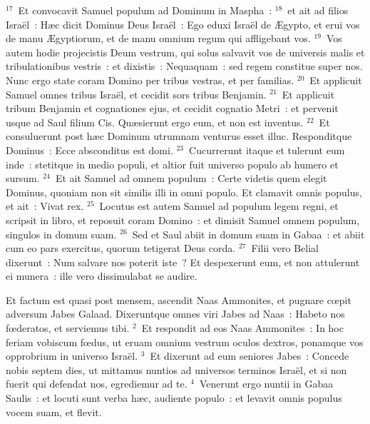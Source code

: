 ${}^{17}$~Et convocavit Samuel populum ad Dominum in Maspha~:
${}^{18}$~et ait ad filios Isra\"el~: H\ae c dicit Dominus Deus Isra\"el~: Ego eduxi Isra\"el de \AE gypto, et erui vos de manu \AE gyptiorum, et de manu omnium regum qui affligebant vos.
${}^{19}$~Vos autem hodie projecistis Deum vestrum, qui solus salvavit vos de universis malis et tribulationibus vestris~: et dixistis~: Nequaquam~: sed regem constitue super nos. Nunc ergo state coram Domino per tribus vestras, et per familias.
${}^{20}$~Et applicuit Samuel omnes tribus Isra\"el, et cecidit sors tribus Benjamin.
${}^{21}$~Et applicuit tribum Benjamin et cognationes ejus, et cecidit cognatio Metri~: et pervenit usque ad Saul filium Cis. Qu\ae sierunt ergo eum, et non est inventus.
${}^{22}$~Et consuluerunt post h\ae c Dominum utrumnam venturus esset illuc. Responditque Dominus~: Ecce absconditus est domi.
${}^{23}$~Cucurrerunt itaque et tulerunt eum inde~: stetitque in medio populi, et altior fuit universo populo ab humero et sursum.
${}^{24}$~Et ait Samuel ad omnem populum~: Certe videtis quem elegit Dominus, quoniam non sit similis illi in omni populo. Et clamavit omnis populus, et ait~: Vivat rex.
${}^{25}$~Locutus est autem Samuel ad populum legem regni, et scripsit in libro, et reposuit coram Domino~: et dimisit Samuel omnem populum, singulos in domum suam.
${}^{26}$~Sed et Saul abiit in domum suam in Gabaa~: et abiit cum eo pars exercitus, quorum tetigerat Deus corda.
${}^{27}$~Filii vero Belial dixerunt~: Num salvare nos poterit iste~? Et despexerunt eum, et non attulerunt ei munera~: ille vero dissimulabat se audire.

\lettrine[lines=10,image=true,loversize=0.05,lraise=-0.03]{E}{}t factum est quasi post mensem, ascendit Naas Ammonites, et pugnare cœpit adversum Jabes Galaad. Dixeruntque omnes viri Jabes ad Naas~: Habeto nos fœderatos, et serviemus tibi.
${}^{2}$~Et respondit ad eos Naas Ammonites~: In hoc feriam vobiscum fœdus, ut eruam omnium vestrum oculos dextros, ponamque vos opprobrium in universo Isra\"el.
${}^{3}$~Et dixerunt ad eum seniores Jabes~: Concede nobis septem dies, ut mittamus nuntios ad universos terminos Isra\"el, et si non fuerit qui defendat nos, egrediemur ad te.
${}^{4}$~Venerunt ergo nuntii in Gabaa Saulis~: et locuti sunt verba h\ae c, audiente populo~: et levavit omnis populus vocem suam, et flevit.


